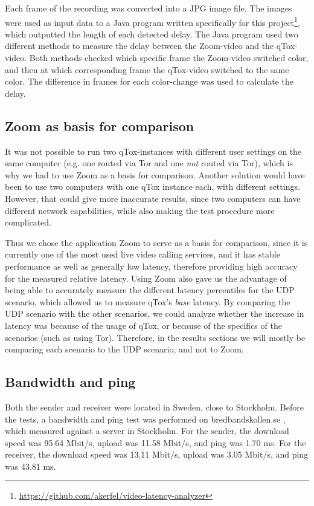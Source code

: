 \documentclass{kththesis}
\begin{document}
Each frame of the recording was converted into a JPG image file. The images were used as input data to a Java program written specifically for this project\footnote{\url{https://github.com/akerfel/video-latency-analyzer}}, which outputted the length of each detected delay. The Java program used two different methods to measure the delay between the Zoom-video and the qTox-video. Both methods checked which specific frame the Zoom-video switched color, and then at which corresponding frame the qTox-video switched to the same color. The difference in frames for each color-change was used to calculate the delay.

\subsection{Zoom as basis for comparison}
It was not possible to run two qTox-instances with different user settings on the same computer (e.g. one routed via Tor and one \emph{not} routed via Tor), which is why we had to use Zoom as a basis for comparison. Another solution would have been to use two computers with one qTox instance each, with different settings. However, that could give more inaccurate results, since two computers can have different network capabilities, while also making the test procedure more complicated.

Thus we chose the application Zoom to serve as a basis for comparison, since it is currently one of the most used live video calling services, and it has stable performance as well as generally low latency, therefore providing high accuracy for the measured relative latency. Using Zoom also gave us the advantage of being able to accurately measure the different latency percentiles for the UDP scenario, which allowed us to measure qTox's \emph{base} latency. By comparing the UDP scenario with the other scenarios, we could analyze whether the increase in latency was because of the usage of qTox, or because of the specifics of the scenarios (such as using Tor). Therefore, in the results sections we will mostly be comparing each scenario to the UDP scenario, and not to Zoom.

\subsection{Bandwidth and ping}
Both the sender and receiver were located in Sweden, close to Stockholm. Before the tests, a bandwidth and ping test was performed on bredbandskollen.se \parencite{bredbandskollen}, which measured against a server in Stockholm. For the sender, the download speed was 95.64 Mbit/s, upload was 11.58 Mbit/s, and ping was 1.70 ms. For the receiver, the download speed was 13.11 Mbit/s, upload was 3.05 Mbit/s, and ping was 43.81 ms.
\end{document}
